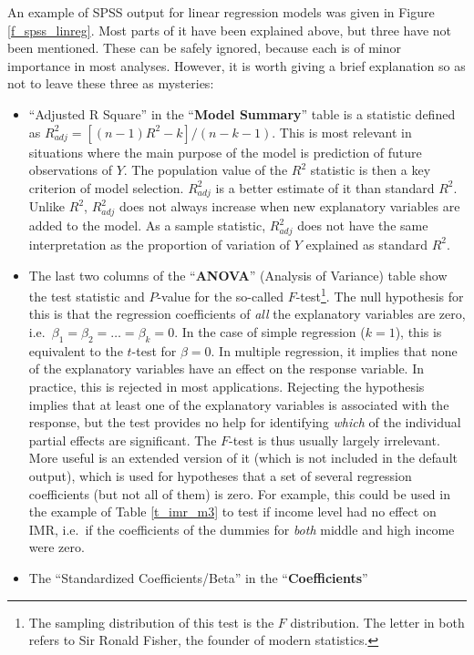 An example of SPSS output for linear regression models was given in
Figure \ref{f_spss_linreg}. Most parts of it have been explained above,
but three have not been mentioned. These can be safely ignored,
because each is of minor importance in most analyses. However, it
is worth giving a brief explanation so as not to leave these three as
mysteries:
\begin{itemize}
\item
``Adjusted R Square'' in the ``\textbf{Model Summary}'' table is a
statistic defined as $R^{2}_{adj}=[(n-1)R^{2}-k]/(n-k-1)$. This is most
relevant in situations where the main purpose of the model is prediction of
future observations of $Y$. The population value of the $R^{2}$
statistic is then a key criterion of model selection. $R^{2}_{adj}$ is a
better estimate of it than standard $R^{2}$. Unlike $R^{2}$,
$R^{2}_{adj}$ does not always increase when new explanatory variables
are added to the model. As a sample statistic,
$R^{2}_{adj}$ does not have the same
interpretation as the proportion of variation of $Y$
explained as standard $R^{2}$.
\item
The last two columns of the ``\textbf{ANOVA}'' (Analysis of Variance)
table show the test statistic and $P$-value for the so-called
$F$-test\footnote{The sampling distribution of this test is the
$F$ distribution. The letter in both refers to Sir Ronald Fisher, the
founder of modern statistics.}. The null hypothesis for this is that the
regression coefficients of \emph{all} the explanatory variables are
zero, i.e.\ $\beta_{1}=\beta_{2}=\dots=\beta_{k}=0$. In the case of
simple regression ($k=1$), this is equivalent to the $t$-test for
$\beta=0$. In multiple regression, it implies that none of the
explanatory variables have an effect on the response variable. In
practice, this is rejected in most applications. Rejecting the
hypothesis implies that at least one of the explanatory variables is
associated with the response, but the test provides no help for
identifying \emph{which} of the individual partial effects are significant. The
$F$-test is thus usually largely irrelevant. More useful is an extended
version of it (which is not included in the default output), which is
used for hypotheses that a set of several regression coefficients (but
not all of them) is zero. For example, this could be used in the example
of Table \ref{t_imr_m3} to test if income level had no effect on IMR,
i.e.\ if the coefficients of the dummies for \emph{both} middle and high
income were zero.
\item
The ``Standardized Coefficients/Beta'' in the ``\textbf{Coefficients}''

\end{itemize}

